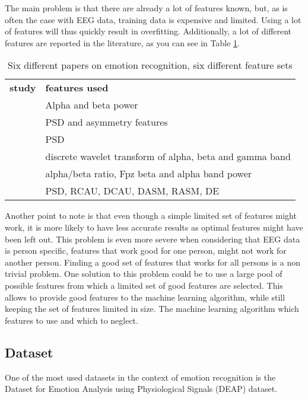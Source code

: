 \npar

The main problem is that there are already a lot of features known, but, as is often the case with EEG data, training data is expensive and limited. Using a lot of features will thus quickly result in overfitting. Additionally, a lot of different features are reported in the literature, as you can see in Table \ref{diffFeat}.

\begin{table}[]
\centering
\caption{Six different papers on emotion recognition, six different feature sets}
\label{diffFeat}
\begin{tabular}{ll}
\textbf{study} & \textbf{features used}                         \\
\citep{ref4}     & Alpha and beta power                           \\
\citep{ref7}     & PSD and asymmetry features                     \\
\citep{ref8}     & PSD                                            \\
\citep{ref6}     & discrete wavelet transform of alpha, beta and gamma band \\
\citep{ExtendedPaper}	&	alpha/beta ratio, Fpz beta and alpha band power \\
\citep{killyPaper} & PSD, RCAU, DCAU, DASM, RASM, DE \\
\end{tabular}
\end{table}

\npar %

Another point to note is that even though a simple limited set of features might work, it is more likely to have less accurate results as optimal features might have been left out. This problem is even more severe when considering that EEG data is person specific, features that work good for one person, might not work for another person. Finding a good set of features that works for all persons is a non trivial problem. One solution to this problem could be to use a large pool of possible features from which a limited set of good features are selected. This allows to provide good features to the machine learning algorithm, while still keeping the set of features limited in size. The machine learning algorithm which features to use and which to neglect.

\subsection{Dataset}
One of the most used datasets in the context of emotion recognition is the Dataset for Emotion Analysis using Physiological Signals (DEAP) dataset\cite{DEAP}.

